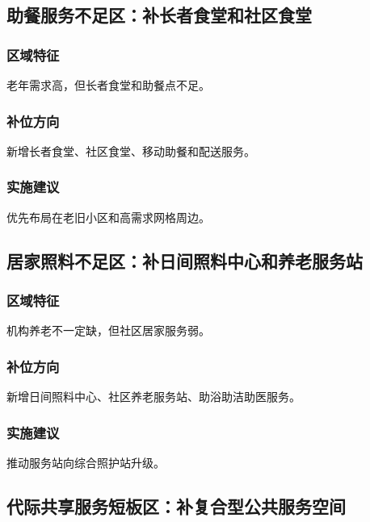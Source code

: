 \documentclass[UTF8,zihao=-4,a4paper,fontset=none]{ctexart}
\begin{document}
\subsection{助餐服务不足区：补长者食堂和社区食堂}

\subsubsection{区域特征}

老年需求高，但长者食堂和助餐点不足。

\subsubsection{补位方向}

新增长者食堂、社区食堂、移动助餐和配送服务。

\subsubsection{实施建议}

优先布局在老旧小区和高需求网格周边。

\subsection{居家照料不足区：补日间照料中心和养老服务站}

\subsubsection{区域特征}

机构养老不一定缺，但社区居家服务弱。

\subsubsection{补位方向}

新增日间照料中心、社区养老服务站、助浴助洁助医服务。

\subsubsection{实施建议}

推动服务站向综合照护站升级。

\subsection{代际共享服务短板区：补复合型公共服务空间}
\end{document}
